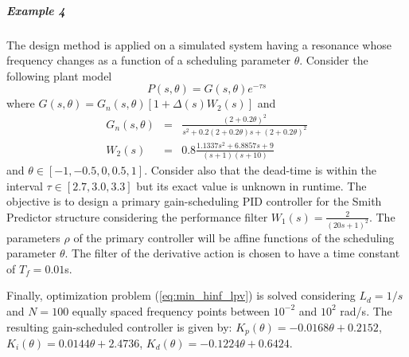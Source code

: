 \documentclass[default]{svmult}
\begin{document}

\subparagraph{Example 4}
The design method is applied on a simulated system having a resonance
whose frequency changes as a function of a scheduling
parameter $\theta$. Consider the following plant model
\begin{equation}
P(s,\theta)=G(s,\theta)e^{-\tau s}
\end{equation}
where $G(s,\theta)=G_n(s,\theta)[1+\Delta(s)W_2(s)]$ and
\begin{eqnarray}
G_n(s,\theta)&=&\frac{(2+0.2\theta)^2 }{s^2+0.2(2+0.2\theta)s+(2+0.2\theta)^2} \\
W_2(s)&=&0.8\frac{1.1337s^2+6.8857s + 9}{(s+1)(s+10)}
\end{eqnarray}
and $\theta \in [-1, -0.5, 0, 0.5, 1]$.
Consider also that the dead-time is within the interval $\tau \in [2.7, 3.0, 3.3]$ but its exact value is unknown in runtime. 
The objective is to design a primary gain-scheduling PID controller for the Smith Predictor structure  considering the performance filter 
$
 W_1(s)=\frac{2}{(20s+1)^2}
$.
 The parameters $\rho$ of the primary controller will be affine functions of the scheduling parameter $\theta$. The filter of the derivative
action is chosen to have a time constant of $T_f=0.01$s.

Finally, optimization problem (\ref{eq:min_hinf_lpv}) is solved considering $L_d=1/s$ and $N=100$ equally spaced frequency points between $10^{-2}$ and $10^2$ rad/s. 
The resulting gain-scheduled controller is given by:
$K_p(\theta)=   -0.0168 \theta +     0.2152$, $K_i(\theta)=  0.0144\theta +   2.4736$, 
$K_d(\theta)=-0.1224 \theta+   0.6424$.
\end{document}
